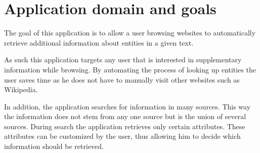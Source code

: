 \section{Application domain and goals}
The goal of this application is to allow a user browsing websites to automatically retrieve additional information about entities in a given text. 

As such this application targets any user that is interested in supplementary information while browsing. By automating the process of looking up entities the user saves time as he does not have to manually visit other websites such as Wikipedia. 

In addition, the application searches for information in many sources. This way the information does not stem from any one source but is the union of several sources.  During search the application retrieves only certain attributes. These attributes can be customized by the user, thus allowing him to decide which information should be retrieved. 